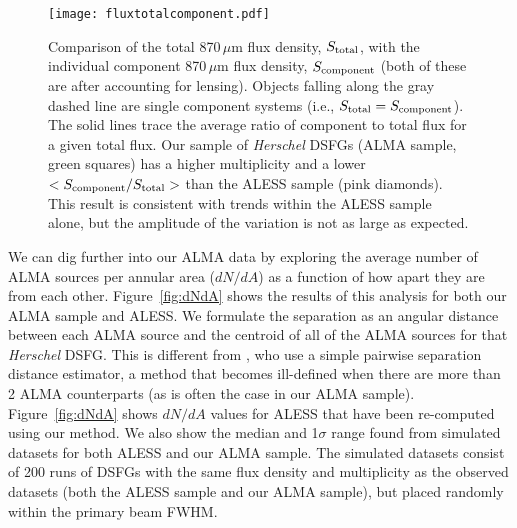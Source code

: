 \documentclass[iop]{emulateapj}
\begin{document}
\begin{figure}[!tbp] 
\texttt{[image: fluxtotalcomponent.pdf]}

\caption{ Comparison of the total 870$\,\mu$m flux density, $S_{\rm total}$,
with the individual component 870$\,\mu$m flux density, $S_{\rm component}$
(both of these are after accounting for lensing).  Objects falling along the
gray dashed line are single component systems (i.e., $S_{\rm total} = S_{\rm
component}$).  The solid lines trace the average ratio of component to total
flux for a given total flux.  Our sample of {\it Herschel} DSFGs (ALMA sample,
green squares) has a higher multiplicity and a lower $<S_{\rm component}/S_{\rm
total}>$ than the ALESS sample (pink diamonds).  This result is consistent with
trends within the ALESS sample alone, but the amplitude of the variation is not
as large as expected.} \label{fig:componentflux}

\end{figure}


We can dig further into our ALMA data by exploring the average number of ALMA
sources per annular area ($dN/dA$) as a function of how apart they are from
each other.  Figure~\ref{fig:dNdA} shows the results of this analysis for both
our ALMA sample and ALESS.  We formulate the separation as an angular distance
between each ALMA source and the centroid of all of the ALMA sources for that
{\it Herschel} DSFG.  This is different from \citet{Hodge:2013qy}, who use a
simple pairwise separation distance estimator, a method that becomes
ill-defined when there are more than 2 ALMA counterparts (as is often the case
in our ALMA sample).  Figure~\ref{fig:dNdA} shows $dN/dA$ values for ALESS that
have been re-computed using our method.  We also show the median and 1$\sigma$
range found from simulated datasets for both ALESS and our ALMA sample.  The
simulated datasets consist of 200 runs of DSFGs with the same flux density and
multiplicity as the observed datasets (both the ALESS sample and our ALMA
sample), but placed randomly within the primary beam FWHM.
\end{document}
